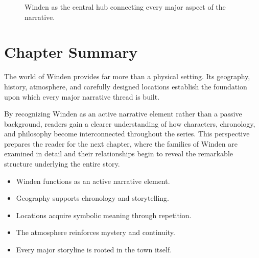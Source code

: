 \documentclass[12pt,oneside,openany]{book}
\begin{document}
\begin{figure}[H]
\centering
{}
\caption{Winden as the central hub connecting every major aspect of the narrative.}
\end{figure}

\section{Chapter Summary}

The world of Winden provides far more than a physical setting. Its geography,
history, atmosphere, and carefully designed locations establish the foundation
upon which every major narrative thread is built.

By recognizing Winden as an active narrative element rather than a passive
background, readers gain a clearer understanding of how characters,
chronology, and philosophy become interconnected throughout the series. This
perspective prepares the reader for the next chapter, where the families of
Winden are examined in detail and their relationships begin to reveal the
remarkable structure underlying the entire story.

\begin{tcolorbox}[colback=orange!8,colframe=orange!70!black,title=Chapter Takeaways]
\begin{itemize}
\item Winden functions as an active narrative element.
\item Geography supports chronology and storytelling.
\item Locations acquire symbolic meaning through repetition.
\item The atmosphere reinforces mystery and continuity.
\item Every major storyline is rooted in the town itself.
\end{itemize}
\end{tcolorbox}
\end{document}
